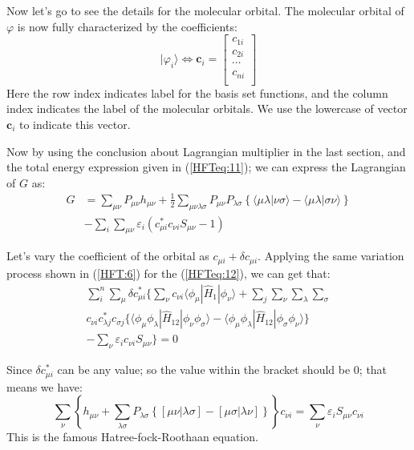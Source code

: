 Now let's go to see the details for the molecular orbital. The molecular orbital
of $\varphi$ is now fully characterized by the coefficients:
\begin{equation}\label{HFTeq:39}
|\varphi_{i}\rangle \Leftrightarrow \bm{c}_{i} = \begin{bmatrix}
  c_{1i} \\
  c_{2i} \\
  \cdots \\
  c_{ni} \\
\end{bmatrix}
\end{equation}
Here the row index indicates label for the basis set functions, and
the column index indicates the label of the molecular orbitals. We
use the lowercase of vector $\bm{c}_{i}$ to indicate this vector.

Now by using the conclusion about Lagrangian multiplier in the last section,
and the total energy expression given in (\ref{HFTeq:11}); we can express the
Lagrangian of $G$ as:
\begin{align}\label{HFTeq:12}
    G &= \sum_{\mu \nu}P_{\mu\nu}h_{\mu \nu} + \frac{1}{2}
    \sum_{\mu \nu \lambda\sigma}P_{\mu\nu}P_{\lambda\sigma}
    \left \{ \langle\mu\lambda|\nu\sigma\rangle -
\langle\mu\lambda|\sigma\nu\rangle
    \right \} \nonumber \\
    &-\sum_{i}\sum_{\mu\nu}\varepsilon_{i}(c^{*}_{\mu i}c_{\nu i}S_{\mu\nu} -
1)
\end{align}

Let's vary the coefficient of the orbital as $c_{\mu i} + \delta
c_{\mu i}$. Applying the same variation process shown in (\ref{HFT:6}) for the
(\ref{HFTeq:12}), we
can get that:
\begin{multline}\label{}
\sum_{i}^{n}\sum_{\mu} \delta c^{*}_{\mu i} \Big \{ \sum_{\nu}
c_{\nu i} \langle\phi_{\mu}|\hat{H}_{1}|\phi_{\nu}\rangle +
\sum_{j}\sum_{\nu} \sum_{\lambda}
\sum_{\sigma} \\
 c_{\nu i} c^{*}_{\lambda j} c_{\sigma j}
 \{
\langle\phi_{\mu}\phi_{\lambda}|\hat{H}_{12}|\phi_{\nu}\phi_{\sigma}\rangle-
\langle\phi_{\mu}\phi_{\lambda}|\hat{H}_{12}|\phi_{\sigma}\phi_{\nu}\rangle
\} \\
- \sum_{\nu}\varepsilon_{i}c_{\nu i}S_{\mu\nu} \Big \} = 0
\end{multline}

Since $\delta c^{*}_{\mu i}$ can be any value; so the value within
the bracket should be 0; that means we have:
\begin{equation}\label{HFTeq:36}
\sum_{\nu}  \left \{
    h_{\mu \nu} +
    \sum_{\lambda\sigma}P_{\lambda\sigma}
    \left \{ [\mu\nu | \lambda\sigma] - [\mu\sigma|\lambda\nu]
    \right \} \right \}c_{\nu i} = \sum_{\nu}
    \varepsilon_{i}S_{\mu\nu}c_{\nu i}
\end{equation}
This is the famous Hatree-fock-Roothaan equation.


